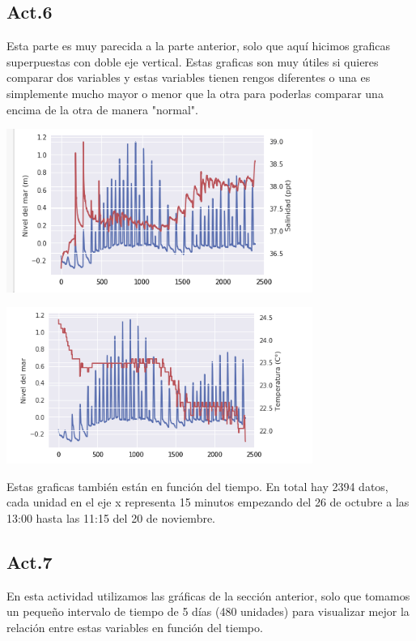 \documentclass{article}
\begin{document}
\subsection*{Act.6}
Esta parte es muy parecida a la parte anterior, solo que aquí hicimos graficas superpuestas con doble eje vertical. Estas graficas son muy útiles si quieres comparar dos variables y estas variables tienen rengos diferentes o una es simplemente mucho mayor o menor que la otra para poderlas comparar una encima de la otra de manera "normal".

\vspace{0.4cm}

\begin{center}
	\includegraphics[width=10cm]{WL+SALY.png}
      
\end{center}
\vspace{0.2cm}

\begin{center}
	\includegraphics[width=10cm]{WL+TEMP.png}
        
\end{center}
\vspace{0.4cm}

Estas graficas también están en función del tiempo. En total hay 2394 datos, cada unidad en el eje x representa 15 minutos empezando del 26 de octubre a las 13:00 hasta las 11:15 del 20 de noviembre.

\subsection*{Act.7}
En esta actividad utilizamos las gráficas de la sección anterior, solo que tomamos un pequeño intervalo de tiempo de 5 días (480 unidades) para visualizar mejor la relación entre estas variables en función del tiempo.
\end{document}
